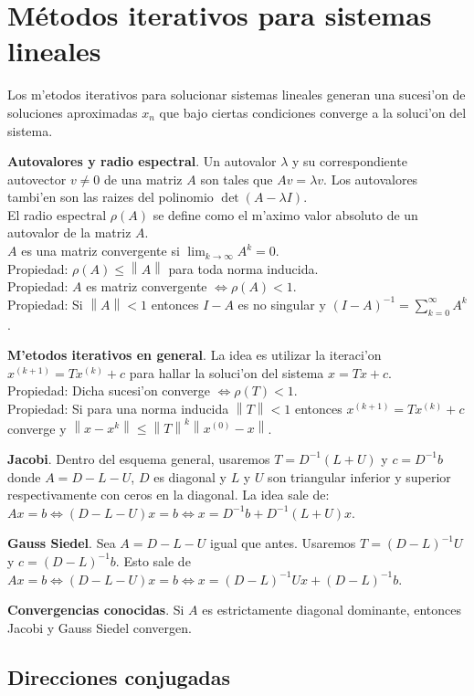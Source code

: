 \documentclass[a4paper,spanish]{article}
\newcommand{\norma}[1]{\left\|#1\right\|}
\newcommand{\limite}[2]{\lim_{ #1 \rightarrow #2}}
\newcommand{\liff}[0]{\Leftrightarrow}
\begin{document}
\section{M\'etodos iterativos para sistemas lineales}

Los m'etodos iterativos para solucionar sistemas lineales generan una sucesi'on
de soluciones aproximadas $x_n$ que bajo ciertas condiciones converge a la
soluci'on del sistema.

\textbf{Autovalores y radio espectral}. Un autovalor $\lambda$ y su
correspondiente autovector $v \neq 0$ de una matriz $A$ son tales que 
$Av=\lambda v$. Los autovalores tambi'en son las raizes del polinomio
$\det(A-\lambda I)$. \\
El radio espectral $\rho(A)$ se define como el m'aximo valor absoluto de un
autovalor de la matriz $A$. \\
$A$ es una matriz convergente si $\limite{k}{\infty} A^k = 0$. \\
Propiedad: $\rho(A) \leq \norma{A}$ para toda norma inducida. \\
Propiedad: $A$ es matriz convergente $\liff \rho(A) < 1$. \\
Propiedad: Si $\norma{A} < 1$ entonces $I-A$ es no singular y 
$(I-A)^{-1} = \sum_{k=0}^\infty A^k$.

\textbf{M'etodos iterativos en general}. La idea es utilizar la iteraci'on
$x^{(k+1)} = T x^{(k)} + c$ para hallar la soluci'on del sistema
$x = T x + c$. \\
Propiedad: Dicha sucesi'on converge $\liff \rho(T) < 1$. \\
Propiedad: Si para una norma inducida $\norma{T} < 1$ entonces
$x^{(k+1)} = T x^{(k)} + c$ converge y
$\norma{x-x^k} \leq \norma{T}^k \norma{x^{(0)}-x}$.

\textbf{Jacobi}. Dentro del esquema general, usaremos 
$T = D^{-1}(L+U)$ y $c = D^{-1}b$ donde $A = D - L - U$, $D$ es diagonal y $L$
y $U$ son triangular inferior y superior respectivamente con ceros en la
diagonal. La idea sale de: 
$Ax = b \liff (D-L-U)x = b \liff x = D^{-1}b + D^{-1}(L+U)x$.

\textbf{Gauss Siedel}. Sea $A = D - L - U$ igual que antes. Usaremos 
$T = (D-L)^{-1}U$ y $c = (D-L)^{-1}b$. Esto sale de $Ax = b \liff (D-L-U)x = b
\liff x = (D-L)^{-1}Ux + (D-L)^{-1}b$.

\textbf{Convergencias conocidas}. Si $A$ es estrictamente diagonal dominante,
entonces Jacobi y Gauss Siedel convergen.

\subsection{Direcciones conjugadas}
\end{document}
